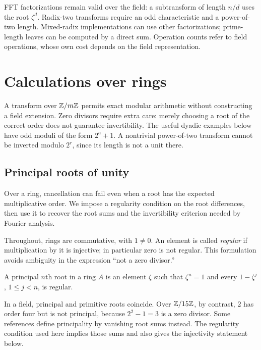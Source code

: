 FFT factorizations remain valid over the field: a subtransform of length
$n/d$ uses the root $\zeta^d$. Radix-two transforms require an odd
characteristic and a power-of-two length. Mixed-radix implementations can
use other factorizations; prime-length leaves can be computed by a direct
sum. Operation counts refer to field operations, whose own cost depends on
the field representation.

\section{Calculations over rings}
\label{sect1-calculations-ring}
A transform over $\mathbb{Z}/m\mathbb{Z}$ permits exact modular arithmetic without
constructing a field extension. Zero divisors require extra care: merely
choosing a root of the correct order does not guarantee invertibility.
The useful dyadic examples below have odd moduli of the form $2^a+1$.
A nontrivial power-of-two transform cannot be inverted modulo $2^r$,
since its length is not a unit there.

\subsection{Principal roots of unity}
\label{sect2-main-roots}

Over a ring, cancellation can fail even when a root has the expected
multiplicative order. We impose a regularity condition on the root
differences, then use it to recover the root sums and the invertibility
criterion needed by Fourier analysis.

Throughout, rings are commutative, with $1\ne0$. An element is called
\emph{regular} if multiplication by it is injective; in particular zero
is not regular. This formulation avoids ambiguity in the expression
``not a zero divisor.''


\begin{defn}
A principal $n$th root in a ring $A$ is an element $\zeta$ such that
$\zeta^n=1$ and every $1-\zeta^j$, $1\leq j<n$, is regular.
\end{defn}
In a field, principal and primitive roots coincide. Over $\mathbb{Z}/15\mathbb{Z}$,
by contrast, $2$ has order four but is not principal, because
$2^2-1=3$ is a zero divisor.
Some references define principality by vanishing root sums instead.
The regularity condition used here implies those sums and also gives the
injectivity statement below.

